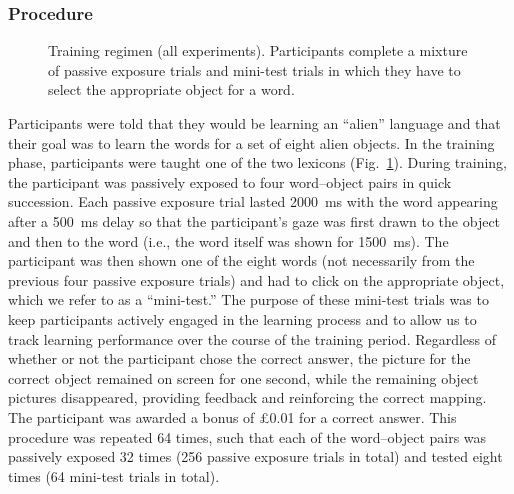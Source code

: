 \documentclass[doc,biblatex]{apa7}
\begin{document}
\subsubsection{Procedure}

\begin{figure}
\vspace*{2pt}
\caption{Training regimen (all experiments). Participants complete a mixture of passive exposure trials and mini-test trials in which they have to select the appropriate object for a word.}
\label{fig03}
\end{figure}

Participants were told that they would be learning an ``alien'' language and that their goal was to learn the words for a set of eight alien objects. In the training phase, participants were taught one of the two lexicons (Fig.~\ref{fig03}). During training, the participant was passively exposed to four word--object pairs in quick succession. Each passive exposure trial lasted 2000~ms with the word appearing after a 500~ms delay so that the participant's gaze was first drawn to the object and then to the word (i.e., the word itself was shown for 1500~ms). The participant was then shown one of the eight words (not necessarily from the previous four passive exposure trials) and had to click on the appropriate object, which we refer to as a ``mini-test.'' The purpose of these mini-test trials was to keep participants actively engaged in the learning process and to allow us to track learning performance over the course of the training period. Regardless of whether or not the participant chose the correct answer, the picture for the correct object remained on screen for one second, while the remaining object pictures disappeared, providing feedback and reinforcing the correct mapping. The participant was awarded a bonus of £0.01 for a correct answer. This procedure was repeated 64 times, such that each of the word--object pairs was passively exposed 32 times (256 passive exposure trials in total) and tested eight times (64 mini-test trials in total).
\end{document}
